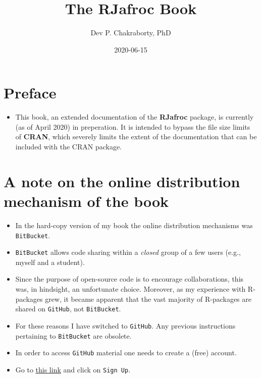 \documentclass[
]{book}
\title{The RJafroc Book}
\author{Dev P. Chakraborty, PhD}
\date{2020-06-15}
\providecommand{\tightlist}{%
  \setlength{\itemsep}{0pt}\setlength{\parskip}{0pt}}
\begin{document}
\maketitle

{
\setcounter{tocdepth}{1}
\tableofcontents
}
\hypertarget{preface}{%
\chapter*{Preface}\label{preface}}

\begin{itemize}
\tightlist
\item
  This book, an extended documentation of the \textbf{RJafroc} package, is currently (as of April 2020) in preperation. It is intended to bypass the file size limits of \textbf{CRAN}, which severely limits the extent of the documentation that can be included with the CRAN package.
\end{itemize}

\hypertarget{a-note-on-the-online-distribution-mechanism-of-the-book}{%
\chapter*{A note on the online distribution mechanism of the book}\label{a-note-on-the-online-distribution-mechanism-of-the-book}}

\begin{itemize}
\tightlist
\item
  In the hard-copy version of my book \citep{RN2680} the online distribution mechanisms was \texttt{BitBucket}.
\item
  \texttt{BitBucket} allows code sharing within a \emph{closed} group of a few users (e.g., myself and a student).
\item
  Since the purpose of open-source code is to encourage collaborations, this was, in hindsight, an unfortunate choice. Moreover, as my experience with R-packages grew, it became apparent that the vast majority of R-packages are shared on \texttt{GitHub}, not \texttt{BitBucket}.
\item
  For these reasons I have switched to \texttt{GitHub}. Any previous instructions pertaining to \texttt{BitBucket} are obsolete.
\item
  In order to access \texttt{GitHub} material one needs to create a (free) account.
\item
  Go to \href{https://github.com}{this link} and click on \texttt{Sign\ Up}.
\end{itemize}
\end{document}
